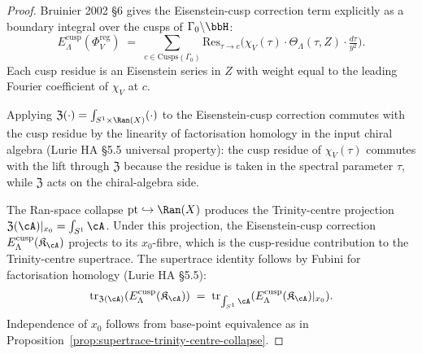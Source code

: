 \begin{proof}
Bruinier 2002 \S 6 gives the Eisenstein-cusp correction term explicitly
as a boundary integral over the cusps of $\Gamma_0 \backslash \bbH$:
\[
 E_\Lambda^{\mathrm{cusp}}(\Phi^{\mathrm{reg}}_V) \;=\; \sum_{c \in \mathrm{Cusps}(\Gamma_0)} \mathrm{Res}_{\tau \to c} \bigl(\chi_V(\tau) \cdot \Theta_\Lambda(\tau, Z) \cdot \tfrac{d\tau}{y^2}\bigr).
\]
Each cusp residue is an Eisenstein series in $Z$ with weight equal to
the leading Fourier coefficient of $\chi_V$ at $c$.

Applying $\mathfrak{Z}(\cdot) = \int_{S^1 \times \Ran(X)} (\cdot)$ to the
Eisenstein-cusp correction commutes with the cusp residue by the
linearity of factorisation homology in the input chiral algebra
\textup{(}Lurie HA \S 5.5 universal property\textup{):} the cusp residue
of $\chi_V(\tau)$ commutes with the lift through $\mathfrak{Z}$ because
the residue is taken in the spectral parameter $\tau$, while
$\mathfrak{Z}$ acts on the chiral-algebra side.

The Ran-space collapse $\mathrm{pt} \hookrightarrow \Ran(X)$ produces
the Trinity-centre projection $\mathfrak{Z}(\cA)|_{x_0} = \int_{S^1} \cA$.
Under this projection, the Eisenstein-cusp correction
$E_\Lambda^{\mathrm{cusp}}(\mathfrak{K}_\cA)$ projects to its $x_0$-fibre,
which is the cusp-residue contribution to the Trinity-centre supertrace.
The supertrace identity follows by Fubini for factorisation homology
\textup{(}Lurie HA \S 5.5\textup{):}
\[
 \mathrm{tr}_{\mathfrak{Z}(\cA)}(E_\Lambda^{\mathrm{cusp}}(\mathfrak{K}_\cA))
 \;=\; \mathrm{tr}_{\int_{S^1} \cA}(E_\Lambda^{\mathrm{cusp}}(\mathfrak{K}_\cA)|_{x_0}).
\]
Independence of $x_0$ follows from base-point equivalence as in
Proposition~\ref{prop:supertrace-trinity-centre-collapse}.
\end{proof}

